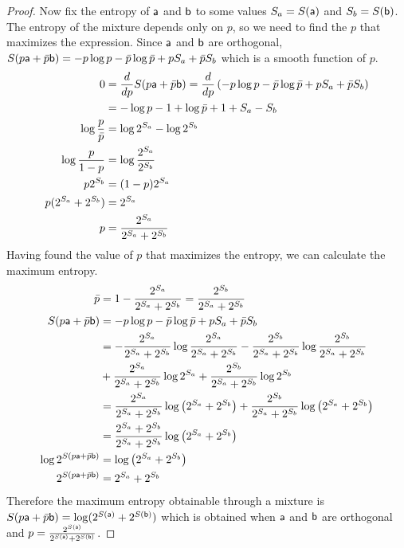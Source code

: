 \begin{mathSection}
\begin{proof}
	Now fix the entropy of $\ens[a]$ and $\ens[b]$ to some values $S_a = S(\ens[a])$ and $S_b = S(\ens[b])$. The entropy of the mixture depends only on $p$, so we need to find the $p$ that maximizes the expression. Since $\ens[a]$ and $\ens[b]$ are orthogonal, $S(p \ens[a] + \bar{p}\ens[b]) =  - p \log p - \bar{p} \log \bar{p} + p S_a + \bar{p} S_b$ which is a smooth function of $p$.
	\begin{equation}
		\begin{aligned}
			0 &= \frac{d}{dp} S(p \ens[a] + \bar{p}\ens[b]) =\frac{d}{dp} \left( - p \log p - \bar{p} \log \bar{p} + p S_a + \bar{p} S_b \right) \\
			&= - \log p - 1 + \log \bar{p} + 1 + S_a - S_b \\
			\log \frac{p}{\bar{p}} &= \log 2^{S_a} - \log 2^{S_b} \\
			\log \frac{p}{1-p} &= \log \frac{2^{S_a}}{2^{S_b}}  \\
			p 2^{S_b} &= (1-p) 2^{S_a}  \\
			p (2^{S_a} + 2^{S_b}) &= 2^{S_a}  \\
			p &= \frac{2^{S_a}}{2^{S_a} + 2^{S_b}}  \\
		\end{aligned}
	\end{equation}
	Having found the value of $p$ that maximizes the entropy, we can calculate the maximum entropy.
	\begin{equation}
		\begin{aligned}
			\bar{p} &= 1- \frac{2^{S_a}}{2^{S_a} + 2^{S_b}} = \frac{2^{S_b}}{2^{S_a} + 2^{S_b}} \\
			S(p \ens[a] + \bar{p}\ens[b]) &= - p \log p - \bar{p} \log \bar{p} + p S_a + \bar{p} S_b  \\
			&= - \frac{2^{S_a}}{2^{S_a} + 2^{S_b}} \log \frac{2^{S_a}}{2^{S_a} + 2^{S_b}} - \frac{2^{S_b}}{2^{S_a} + 2^{S_b}} \log \frac{2^{S_b}}{2^{S_a} + 2^{S_b}} \\
			&+ \frac{2^{S_a}}{2^{S_a} + 2^{S_b}} \log 2^{S_a} + \frac{2^{S_b}}{2^{S_a} + 2^{S_b}} \log 2^{S_b} \\
			&= \frac{2^{S_a}}{2^{S_a} + 2^{S_b}} \log \left( 2^{S_a} + 2^{S_b} \right) + \frac{2^{S_b}}{2^{S_a} + 2^{S_b}} \log \left( 2^{S_a} + 2^{S_b} \right) \\
			&= \frac{2^{S_a} + 2^{S_b}}{2^{S_a} + 2^{S_b}} \log \left( 2^{S_a} + 2^{S_b} \right) \\
			\log 2^{S(p \ens[a] + \bar{p}\ens[b])} &= \log \left( 2^{S_a} + 2^{S_b} \right) \\
			2^{S(p \ens[a] + \bar{p}\ens[b])} &=  2^{S_a} + 2^{S_b}  \\
		\end{aligned}
	\end{equation}
	Therefore the maximum entropy obtainable through a mixture is $S(p \ens[a] + \bar{p}\ens[b]) = \log (2^{S(\ens[a])} + 2^{S(\ens[b])})$ which is obtained when $\ens[a]$ and $\ens[b]$ are orthogonal and $p = \frac{2^{S(\ens[a])}}{2^{S(\ens[a])} + 2^{S(\ens[b])}}$.
\end{proof}


\end{mathSection}
